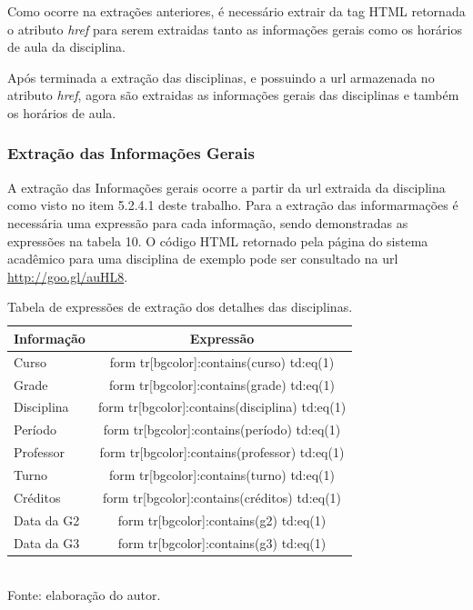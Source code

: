 
Como ocorre na extrações anteriores, é necessário extrair da tag HTML retornada o atributo \emph{href} para serem extraidas tanto as informações gerais como os horários de aula da disciplina.

Após terminada a extração das disciplinas, e possuindo a url armazenada no atributo \emph{href}, agora são extraidas as informações gerais das disciplinas e também os horários de aula.

\subsubsection{Extração das Informações Gerais}
A extração das Informações gerais ocorre a partir da url extraida da disciplina como visto no item 5.2.4.1 deste trabalho. Para a extração das informarmações é necessária uma expressão para cada informação, sendo demonstradas as expressões na tabela 10. O código HTML retornado pela página do sistema acadêmico para uma disciplina de exemplo pode ser consultado na url \url{http://goo.gl/auHL8}.

\begin{table}[!hbt]
\centering
\caption[Extração de Informações - Expressões de Extração dos Detalhes da Disciplina]{Tabela de expressões de extração dos detalhes das disciplinas.}
\vspace{3mm}
\begin{tabular}{p{3cm}|c}\hline
\bf{Informação} & \bf{Expressão}                                 \\ \hline
Curso           & form tr[bgcolor]:contains(curso) td:eq(1)      \\ \hline
Grade           & form tr[bgcolor]:contains(grade) td:eq(1)      \\ \hline
Disciplina      & form tr[bgcolor]:contains(disciplina) td:eq(1) \\ \hline
Período         & form tr[bgcolor]:contains(período) td:eq(1)    \\ \hline
Professor       & form tr[bgcolor]:contains(professor) td:eq(1)  \\ \hline
Turno           & form tr[bgcolor]:contains(turno) td:eq(1)      \\ \hline
Créditos        & form tr[bgcolor]:contains(créditos) td:eq(1)   \\ \hline
Data da G2      & form tr[bgcolor]:contains(g2) td:eq(1)         \\ \hline
Data da G3      & form tr[bgcolor]:contains(g3) td:eq(1)         \\ \hline
\end{tabular}
\\ Fonte: elaboração do autor.
\end{table}

